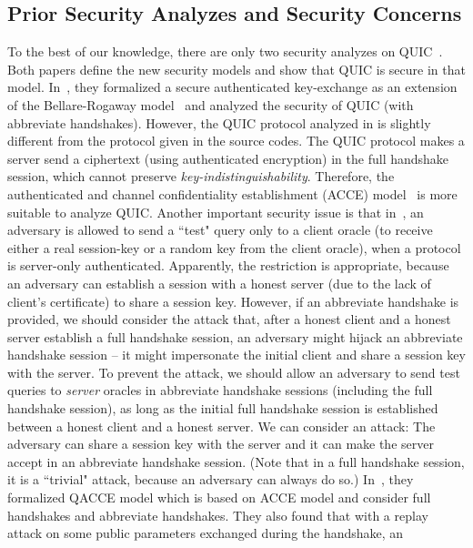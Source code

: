 \subsection{Prior Security Analyzes and Security Concerns} \label{sec:concern}
To the best of our knowledge, there are only two
security analyzes on QUIC~\cite{FG14:QUIC,LJBN15:QUIC}.
Both papers define the new security models and show that
QUIC is secure in that model.
In~\cite{FG14:QUIC}, they formalized a secure
authenticated key-exchange as an extension of the
Bellare-Rogaway model~\cite{BR93:AKE} and analyzed the
security of QUIC (with abbreviate handshakes).
However, the QUIC protocol analyzed in \cite{FG14:QUIC}
is slightly different from the protocol given in the
source codes.
The QUIC protocol makes a
server send a ciphertext (using authenticated
encryption) in the full handshake session, which cannot
preserve \textit{key-indistinguishability}.
Therefore, the authenticated and channel confidentiality
establishment (ACCE) model~\cite{JKSS12:ACCE} is more
suitable to analyze QUIC.
Another important security issue is that in~\cite{FG14:QUIC},
an adversary is allowed to send a ``test" query only to
a client oracle (to receive either a real session-key or
a random key from the client oracle), when a protocol
is server-only authenticated.
Apparently, the restriction is appropriate, because
an adversary can establish a session with a honest
server (due to the lack of client's certificate) to
share a session key.
However, if an abbreviate handshake is provided, we should consider
the attack that, after a honest client and a honest
server establish a full handshake session, an adversary
might hijack an abbreviate handshake session -- it might
impersonate the initial client and share a session key
with the server.
To prevent the attack, we should allow an adversary to
send test queries to \textit{server} oracles in abbreviate
handshake sessions (including the full handshake session), as long
as the initial full handshake session is established
between a honest client and a honest server.
We can consider an attack: The adversary can
share a session key with the server and it can make the
server accept in an abbreviate handshake session. (Note that in a
full handshake session, it is a ``trivial" attack, because
an adversary can always do so.)
In~\cite{LJBN15:QUIC}, they formalized QACCE model which
is based on ACCE model and consider full handshakes and
abbreviate handshakes.
They also found that with a replay attack on some
public parameters exchanged during the handshake, an
